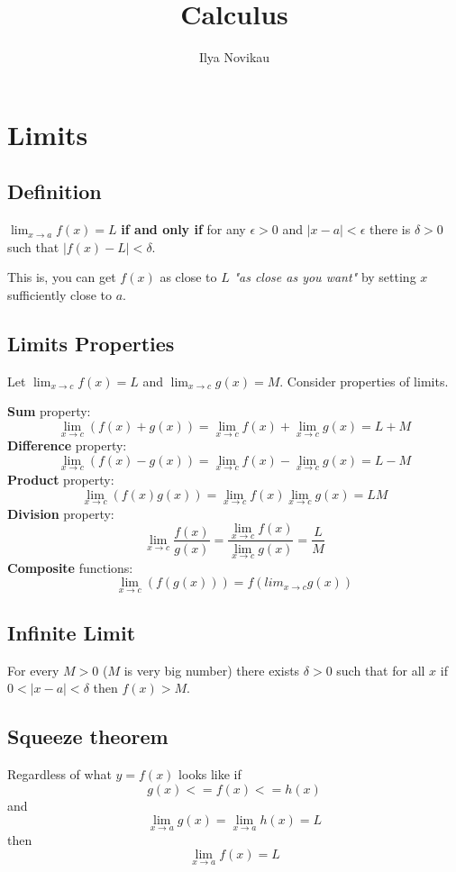 \documentclass[12pt, a4paper]{scrartcl}
\author{Ilya Novikau}
\title{Calculus}
\begin{document}
\maketitle

\tableofcontents

\newpage
\twocolumn

\section{Limits}
\label{sec:limits}

\subsection{Definition}
\label{sec:limits:def}
$\lim_{x \to a}f(x) = L$ \textbf{if and only if} for any $\epsilon > 0$ and $|x - a| < \epsilon$ there is $\delta > 0$ such that $|f(x) - L| < \delta$.\par
This is, you can get $f(x)$ as close to $L$ \textit{"as close as you want"} by setting $x$ sufficiently close to $a$.

\subsection{Limits Properties}
\label{sec:limits:properties}
Let $\lim_{x \to c}f(x)=L$ and $\lim_{x \to c}g(x)=M$. Consider properties of limits.\par
\textbf{Sum} property: $$\lim_{x \to c}(f(x) + g(x)) = \lim_{x \to c}f(x) + \lim_{x \to c}g(x) = L + M$$
\textbf{Difference} property: $$\lim_{x \to c}(f(x) - g(x)) = \lim_{x \to c}f(x) - \lim_{x \to c}g(x) = L - M$$
\textbf{Product} property: $$\lim_{x \to c}(f(x)g(x)) = \lim_{x \to c}f(x) \lim_{x \to c}g(x) = LM$$
\textbf{Division} property: $$\lim_{x \to c}\frac{f(x)}{g(x)}=\frac{\lim_{x \to c}f(x)}{\lim_{x \to c}g(x)}=\frac{L}{M}$$
\textbf{Composite} functions: $$\lim_{x \to c}(f(g(x))) = f(lim_{x \to c}g(x))$$

\subsection{Infinite Limit}
\label{sec:limits:inf_limit}
For every $M > 0$ ($M$ is very big number) there exists $\delta > 0$ such that for all $x$ if $0 < |x - a| < \delta$ then $f(x) > M$.

\subsection{Squeeze theorem}
\label{sec:limits:squeeze_theor}
Regardless of what $y = f(x)$ looks like if $$g(x) <= f(x) <= h(x)$$ and $$\lim_{x \to a}g(x)=\lim_{x \to a}h(x) = L$$ then $$\lim_{x \to a}f(x) = L$$
\end{document}
